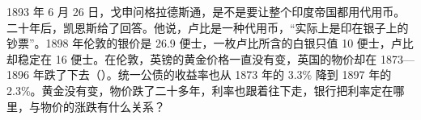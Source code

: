 1893 年 6 月 26 日，戈申问格拉德斯通，是不是要让整个印度帝国都用代用币。二十年后，凯恩斯给了回答。他说，卢比是一种代用币，“实际上是印在银子上的钞票”\cite{keynes1913}。1898 年伦敦的银价是 26.9 便士，一枚卢比所含的白银只值 10 便士，卢比却稳定在 16 便士\cite{lindert2006,keynes1913}。在伦敦，英镑的黄金价格一直没有变，英国的物价却在 1873—1896 年跌了下去（）。统一公债的收益率也从 1873 年的 3.3\% 降到 1897 年的 2.3\%\cite{boe2017}。黄金没有变，物价跌了二十多年，利率也跟着往下走，银行把利率定在哪里，与物价的涨跌有什么关系？
